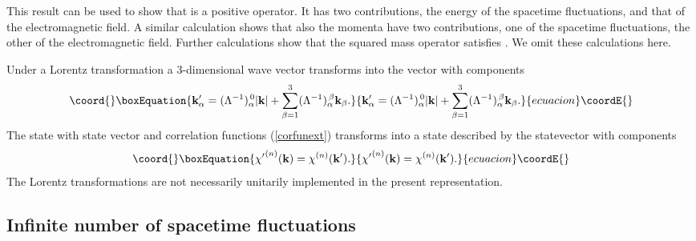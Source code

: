 \documentclass[12pt,a4paper]{article}
\def\kk{{\bf k}}
\begin{document}
This result can be used to show that \coordHE{} is a positive operator.
It has two contributions, the energy of the spacetime fluctuations,
and that of the electromagnetic field.
A similar calculation shows that also the momenta \coordHE{}
have two contributions,
one of the spacetime fluctuations, the other of the electromagnetic field.
Further calculations show that the squared mass operator satisfies
\coordHE{}. We omit these calculations here.

Under a Lorentz transformation \myHighlight{$\Lambda$}\coordHE{} a 3-dimensional wave vector \myHighlight{$\kk$}\coordHE{}
transforms into the vector \myHighlight{$\kk'$}\coordHE{} with components
\begin{equation}\coord{}\boxEquation{
\kk'_\alpha=(\Lambda^{-1})_\alpha^{\,0}|\kk|
+\sum_{\beta=1}^3(\Lambda^{-1})_\alpha^{\,\beta}\kk_\beta.
}{
\kk'_\alpha=(\Lambda^{-1})_\alpha^{\,0}|\kk|
+\sum_{\beta=1}^3(\Lambda^{-1})_\alpha^{\,\beta}\kk_\beta.
}{ecuacion}\coordE{}\end{equation}
The state with state vector \myHighlight{$\chi$}\coordHE{} and correlation functions (\ref{corfunext}) transforms
into a state described by the statevector \coordHE{} with components
\begin{equation}\coord{}\boxEquation{
{\chi'}^{(n)}(\kk)=\chi^{(n)}(\kk').
}{
{\chi'}^{(n)}(\kk)=\chi^{(n)}(\kk').
}{ecuacion}\coordE{}\end{equation}
The Lorentz transformations are not necessarily unitarily implemented
in the present representation.

\subsection{Infinite number of spacetime fluctuations} 
\end{document}
